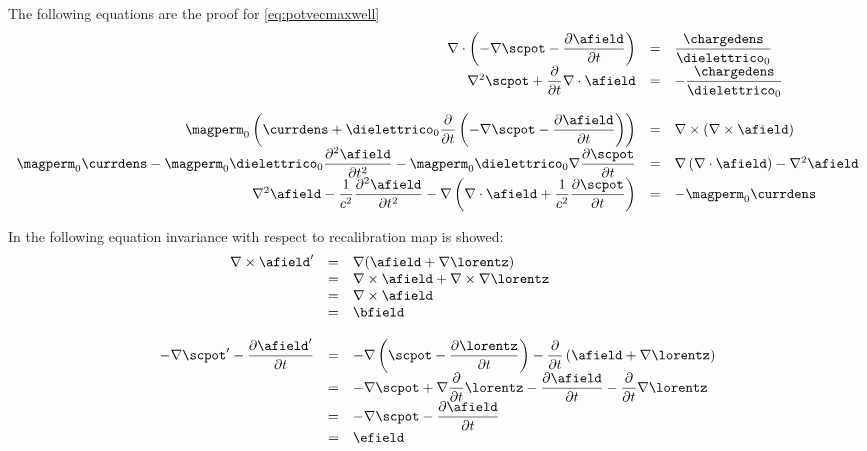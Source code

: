 The following equations are the proof for \ref{eq:potvecmaxwell}
\begin{equation}
\begin{array}{rcl}
\nabla \cdot \left(  - \nabla \scpot - \partialtarg{\afield} \right) & = & \dfrac{\chargedens}{\dielettrico_0} \\
\nabla^2 \scpot + \partialt{\nabla \cdot \afield} & = & -\dfrac{\chargedens}{\dielettrico_0} \\
 & & \\
\magperm_0 \left( \currdens + \dielettrico_0 \partialt\left(- \nabla \scpot - \partialtarg{\afield}\right) \right) & = & \nabla \times \left( \nabla \times \afield \right) \\
\magperm_0 \currdens - \magperm_0 \dielettrico_0 \dfrac{\partial^2 \afield}{\partial t^2} - \magperm_0 \dielettrico_0 \nabla \dfrac{\partial \scpot}{\partial t} & = & \nabla \left( \nabla \cdot \afield \right) - \nabla^2 \afield \\
\nabla^2 \afield - \dfrac{1}{c^2} \dfrac{\partial^2 \afield}{\partial t^2} - \nabla \left( \nabla \cdot \afield + \dfrac{1}{c^2} \dfrac{\partial \scpot}{\partial t} \right) & = & - \magperm_0 \currdens
\end{array}
\label{eq:evidence1}
\end{equation}

In the following equation invariance with respect to recalibration map is showed:
\begin{equation}
\label{eq:prooftransformationmap}
\begin{array}{rcl}
\nabla \times \afield' & = & \nabla(\afield + \nabla \lorentz) \\
 & = & \nabla \times \afield + \nabla \times \nabla \lorentz \\
 & = & \nabla \times \afield \\
 & = & \bfield \\
 & & \\
- \nabla\scpot' - \partialtarg{\afield'} & = & -\nabla \left( \scpot - \partialtarg{\lorentz} \right) - \partialt\left( \afield + \nabla \lorentz \right) \\
 & = & -\nabla \scpot + \nabla \partialt \lorentz - \partialtarg{\afield} - \partialt\nabla\lorentz \\
 & = & -\nabla \scpot - \partialtarg{\afield} \\
 & = & \efield
\end{array}
\end{equation}


